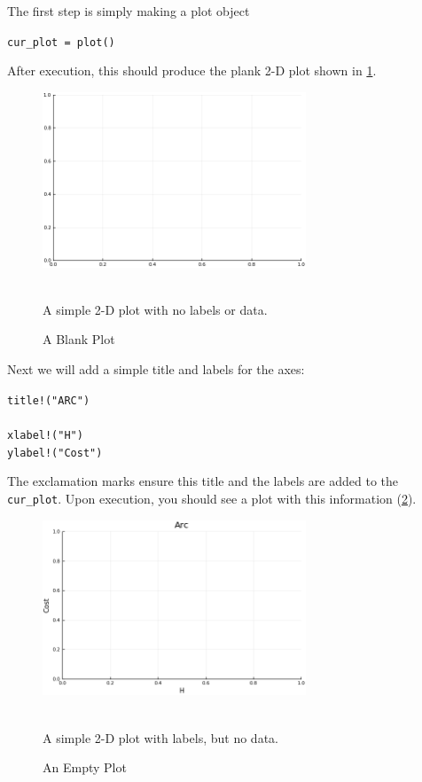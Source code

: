 The first step is simply making a plot object

\begin{addmargin}[1.5em]{1.5em}
\texttt{cur\_plot = plot()}
\end{addmargin}

After execution, this should produce the plank 2-D plot shown in \cref{fig:example_1}.

\begin{figure}
	\centering
	\includegraphics[width=0.7\textwidth]{images/example_1}
	\caption{A Blank Plot} ~\\
	\small A simple 2-D plot with no labels or data.
	\label{fig:example_1}
\end{figure}

Next we will add a simple title and labels for the axes:

\begin{addmargin}[1.5em]{1.5em}
\texttt{title!("ARC") \\ ~ \\
xlabel!("H") \\
ylabel!("Cost")
}
\end{addmargin}

The exclamation marks ensure this title and the labels are added to the \texttt{cur\_plot}. Upon execution, you should see a plot with this information (\cref{fig:example_2}).

\begin{figure}
	\centering
	\includegraphics[width=0.7\textwidth]{images/example_2}
	\caption{An Empty Plot} ~\\
	\small A simple 2-D plot with labels, but no data.
	\label{fig:example_2}
\end{figure}

